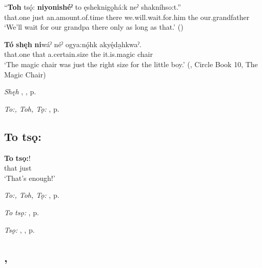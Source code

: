 \ea
\label{ex:tpart100}
\gll “\textbf{Toh} tsǫ́: \textbf{niyonishéˀ} to ęsheknigǫ̱há:k neˀ shakníhso:t.”\\
that.one just an.amount.of.time there we.will.wait.for.him the our.grandfather\\
\glt ‘We’ll wait for our grandpa there only as long as that.’ (\cite{henry_de_2005})
\z

\ea
\label{ex:tpart101}
\gll \textbf{Tó} \textbf{shęh} \textbf{ni}wáˀ néˀ ogya:nǫ́hk akyę́da̱hkwaˀ.\\
that.one that a.certain.size the it.is.magic chair\\
\glt ‘The magic chair was just the right size for the little boy.’ (\cite{keye_circle_2016}, Circle Book 10, The Magic Chair)
\z

\begin{CayugaRelated}
\item \textit{Shęh} , , p. \pageref{p:[shęh] `that’}\\
\item \textit{To:, Toh, Tǫ:} , p. \pageref{p:[to:] ‘that one’}
\end{CayugaRelated}


\subsection*{\textbf{To tsǫ:} } \label{p:[to tsǫ:] ‘that’s enough!’}

\ea
\label{ex:tpart102}
\gll \textbf{To} \textbf{tsǫ:}!\\
that just\\
\glt ‘That’s enough!’
\z

\begin{CayugaRelated}
\item \textit{To:, Toh, Tǫ:} , p. \pageref{p:[to:] ‘that one’}\\
\item \textit{To tsǫ:} , p. \pageref{p:[to tsǫ:] ‘that’s all’}\\
\item \textit{Tsǫ:} , , p. \pageref{p:[tsǫ:]}
\end{CayugaRelated}


\subsection*{ , } \label{p:[to tsǫ:] ‘that’s all’}

